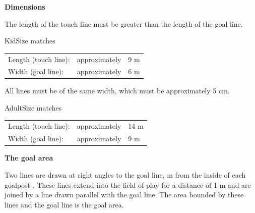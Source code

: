 \bigskip

{\textbf{Dimensions}}

\headlinebox

The length of the touch line must be greater than the length of the goal line. 

\bigskip

KidSize  matches

\begin{tabular}{lll}
Length (touch line): &approximately &9 m \\
Width (goal line): &approximately &6 m
\end{tabular}


\bigskip

All lines must be of the same width, which must be approximately 5 cm. 



\bigskip

AdultSize matches

\begin{tabular}{lll}
Length (touch line): &approximately & 14 m \\ 
Width (goal line): &approximately &9 m\\
\end{tabular}


\bigskip

{\bfseries The goal area }

\headlinebox

Two lines are drawn at right angles to the goal line,
  m from the inside of each goalpost
.
These lines extend into the field of play for a distance of 1 m and are joined
by a line drawn parallel with the goal line.
The area bounded by these lines and the goal line is the goal area.

